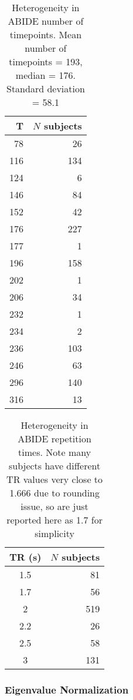 \documentclass[10pt]{article}
\begin{document}
\begin{table}
  \centering
  \begin{tabular}{rr}
  \toprule
  T &   \(N\) subjects \\
  \midrule
   78 &   26 \\
  116 &  134 \\
  124 &    6 \\
  146 &   84 \\
  152 &   42 \\
  176 &  227 \\
  177 &    1 \\
  196 &  158 \\
  202 &    1 \\
  206 &   34 \\
  232 &    1 \\
  234 &    2 \\
  236 &  103 \\
  246 &   63 \\
  296 &  140 \\
  316 &   13 \\
  \bottomrule
\end{tabular}\label{tab:timepoints}
\caption{Heterogeneity in ABIDE number of timepoints. Mean number of timepoints = 193, median = 176. Standard deviation = 58.1}
\end{table}

\begin{table}
  \centering
  \begin{tabular}{cr}
  \toprule
  TR (s) &   \(N\) subjects \\
  \midrule
  1.5  &      81 \\
  1.7 &       56 \\
  2    &     519 \\
  2.2  &      26 \\
  2.5  &      58 \\
  3    &     131 \\
  \bottomrule
  \end{tabular}\label{tab:trs}
\caption{Heterogeneity in ABIDE repetition times. Note many subjects have different TR values very close to 1.666 due to rounding issue, so are just reported here as 1.7 for simplicity}
\end{table}

\subsubsection{Eigenvalue Normalization}
\end{document}
